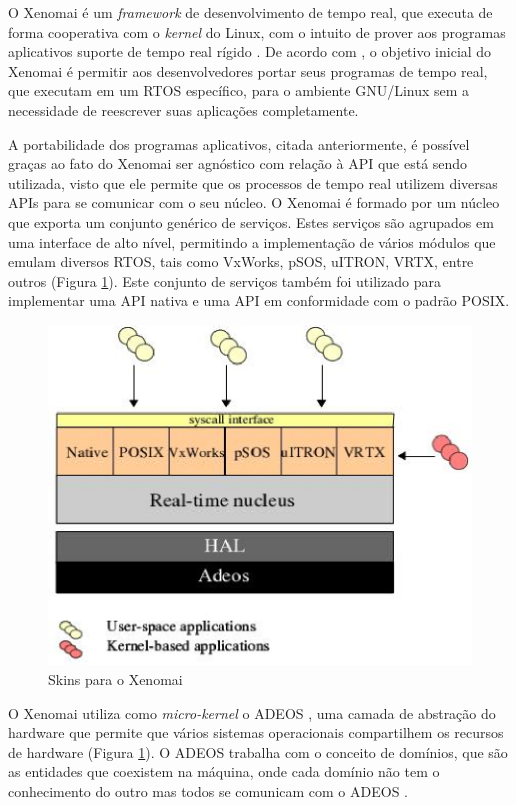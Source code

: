 	O Xenomai é um \textit{framework} de desenvolvimento de tempo real, que executa de forma cooperativa com o \textit{kernel} do Linux, com o intuito de prover aos programas aplicativos suporte de tempo real rígido \cite{XENOMAI08}. De acordo com \cite{GERUM04}, o objetivo inicial do Xenomai é permitir aos desenvolvedores portar seus programas de tempo real, que executam em um RTOS específico, para o ambiente GNU/Linux sem a necessidade de reescrever suas aplicações completamente.
	
	A portabilidade dos programas aplicativos, citada anteriormente, é possível graças ao fato do Xenomai ser agnóstico com relação à API que está sendo utilizada, visto que ele permite que os processos de tempo real utilizem diversas APIs para se comunicar com o seu núcleo. O Xenomai é formado por um núcleo que exporta um conjunto genérico de serviços. Estes serviços são agrupados em uma interface de alto nível, permitindo a implementação de vários módulos que emulam diversos RTOS, tais como VxWorks, pSOS, uITRON, VRTX, entre outros (Figura \ref{fig:xenomai_skins}). Este conjunto de serviços também foi utilizado para implementar uma API nativa e uma API em conformidade com o padrão POSIX.
	
\begin{figure}
\centering
\includegraphics[scale=0.7]{xenomai_skins}
\caption{Skins para o Xenomai \cite{XENO_API06}}
\label{fig:xenomai_skins}
\end{figure}	
	
	O Xenomai utiliza como \textit{micro-kernel} o ADEOS \cite{ADEOS01}, uma camada de abstração do hardware que permite que vários sistemas operacionais compartilhem os recursos de hardware (Figura \ref{fig:xenomai_skins}). O ADEOS trabalha com o conceito de domínios, que são as entidades que coexistem na máquina, onde cada domínio não tem o conhecimento do outro mas todos se comunicam com o ADEOS \cite{ADEOS01}.


